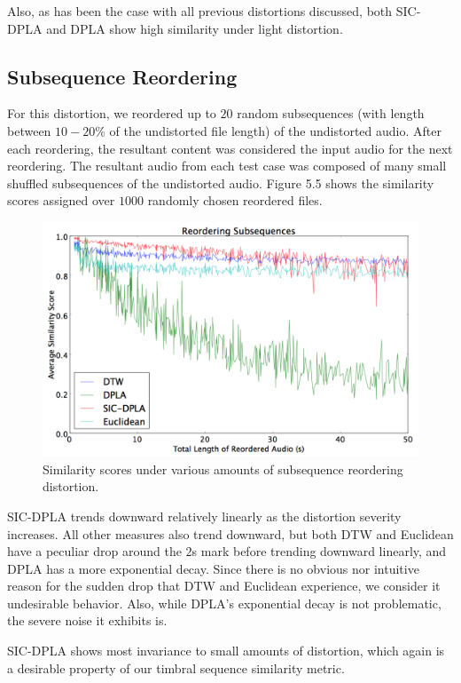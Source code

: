 \documentclass[a4paper,12pt]{report} 	%
\numberwithin{figure}{chapter}
\numberwithin{table}{chapter}
\numberwithin{equation}{chapter}
\begin{document}
\begin{flushleft}
Also, as has been the case with all previous distortions discussed, both SIC-DPLA and DPLA show high similarity under light distortion.

\subsection{Subsequence Reordering}
For this distortion, we reordered up to $20$ random subsequences (with length between $10-20\%$ of the undistorted file length) of the undistorted audio. After each reordering, the resultant content was considered the input audio for the next reordering. The resultant audio from each test case was composed of many small shuffled subsequences of the undistorted audio. Figure 5.5 shows the similarity scores assigned over $1000$ randomly chosen reordered files.
\begin{figure}[h!]
\begin{center}
\includegraphics[scale=0.5,width=\linewidth]{ReorderedAudio}
\caption[Subsequence Reordering Results]{Similarity scores under various amounts of subsequence reordering distortion.}
\end{center}
\end{figure}
SIC-DPLA trends downward relatively linearly as the distortion severity increases. All other measures also trend downward, but both DTW and Euclidean have a peculiar drop around the $2$s mark before trending downward linearly, and DPLA has a more exponential decay. Since there is no obvious nor intuitive reason for the sudden drop that DTW and Euclidean experience, we consider it undesirable behavior. Also, while DPLA's exponential decay is not problematic, the severe noise it exhibits is.

SIC-DPLA shows most invariance to small amounts of distortion, which again is a desirable property of our timbral sequence similarity metric.


\end{flushleft}
\end{document}
